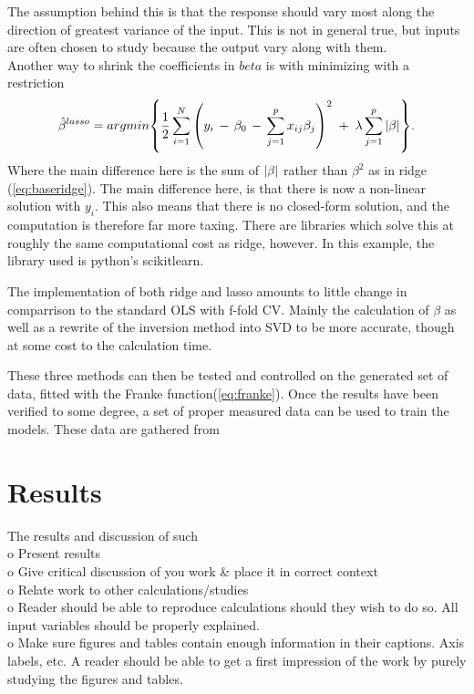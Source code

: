 \documentclass[ 12pt, a4paper ]{article}
\begin{document}
The assumption behind this is that the response should vary most along the direction of greatest
variance of the input. This is not in general true, but inputs are often chosen to study because 
the output vary along with them.\\

Another way to shrink the coefficients in $beta$ is with minimizing with a restriction 
\begin{align}
    \hat{\beta}^{lasso} = argmin\qty{ 
        \frac{1}{2}\sum_{i=1}^N \qty(y_i \,-\, \beta_0 \,-\, \sum_{j=1}^p x_{ij}\beta_j)^2
        \;+\; \lambda\sum_{j=1}^p \abs{\beta}  }.\label{eq:baselasso}
\end{align}
Where the main difference here is the sum of $\abs{\beta}$ rather than $\beta^2$ as in ridge
(\ref{eq:baseridge}). The main difference here, is that there is now a non-linear solution with
$y_i$. This also means that there is no closed-form solution, and the computation is therefore 
far more taxing. There are libraries which solve this at roughly the same computational cost as 
ridge, however. In this example, the library used is python's scikitlearn.
\cite{}%

The implementation of both ridge and lasso amounts to little change in comparrison to the 
standard OLS with f-fold CV. Mainly the calculation of $\beta$ as well as a rewrite of the 
inversion method into SVD to be more accurate, though at some cost to the calculation time. 

These three methods can then be tested and controlled on the generated set of data, fitted with
the Franke function(\ref{eq:franke}). Once the results have been verified to some degree, a set
of proper measured data can be used to train the models. These data are gathered from 
\cite{} %



\section{Results}
    The results and discussion of such\\
    o   Present results \\
    o   Give critical discussion of you work \& place it in correct context\\
    o   Relate work to other calculations/studies\\
    o   Reader should be able to reproduce calculations should they wish to do so. 
        All input variables should be properly explained. \\
    o   Make sure figures and tables contain enough information in their captions. 
        Axis labels, etc. A reader should be able to get a first impression of the work
        by purely studying the figures and tables. \\
\end{document}
